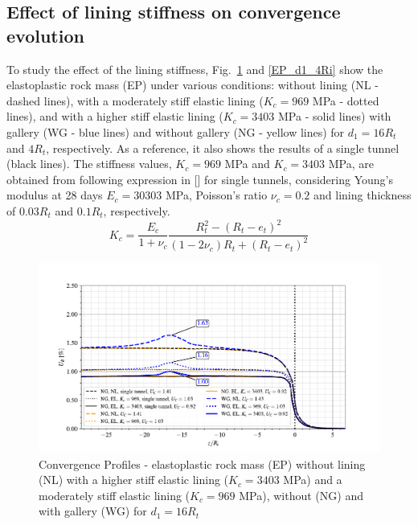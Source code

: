 \documentclass[a4paper,fleqn]{cas-sc}
\begin{document}
\subsection{Effect of lining stiffness on convergence evolution}\label{}

To study the effect of the lining stiffness, Fig.~\ref{EP_d1_16Ri} and \ref{EP_d1_4Ri} show the elastoplastic rock mass (EP) under various conditions: without lining (NL - dashed lines), with a moderately stiff elastic lining ($K_c = 969$ MPa - dotted lines), and with a higher stiff elastic lining ($K_c = 3403$ MPa - solid lines) with gallery (WG - blue lines) and without gallery (NG - yellow lines) for $d_1 = 16R_t$ and $4R_t$, respectively. As a reference, it also shows the results of a single tunnel (black lines). The stiffness values, $K_c = 969$ MPa and $K_c = 3403$ MPa, are obtained from following expression in [] for single tunnels, considering Young's modulus at 28 days $E_c = 30303$ MPa, Poisson's ratio $\nu_c = 0.2$ and lining thickness of $0.03R_t$ and $0.1R_t$, respectively.
\begin{equation} \label{eq:8}
	K_c = \frac{E_c}{1+\nu_c}\frac{R_t^2-(R_t-e_t)^2}{(1-2\nu_c)R_t+(R_t-e_t)^2}
\end{equation}
\begin{figure}[h!]
	\centering
	\includegraphics[scale=0.9]{Convergence Profiles - EP_d1_16Ri_anotate.pdf}
	\caption{Convergence Profiles - elastoplastic rock mass (EP) without lining (NL) with a higher stiff elastic lining ($K_c = 3403$ MPa) and a moderately stiff elastic lining ($K_c = 969$ MPa), without (NG) and with gallery (WG) for $d_1 = 16R_t$}
	\label{EP_d1_16Ri}
\end{figure}
\FloatBarrier
\end{document}
